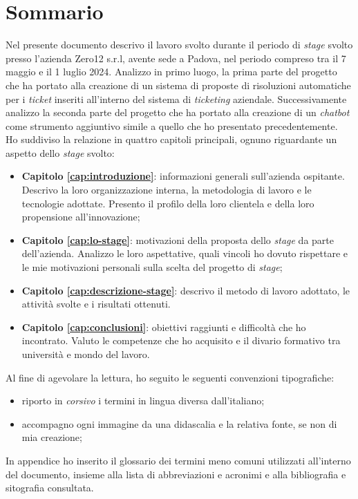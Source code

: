 \cleardoublepage
{}
{}
\begingroup
\let\clearpage\relax
\let\cleardoublepage\relax
\let\cleardoublepage\relax
\chapter*{Sommario}
Nel presente documento descrivo il lavoro svolto durante il periodo di \textit{stage} svolto presso l'azienda Zero12 s.r.l, avente sede a Padova, nel periodo compreso tra il 7 maggio e il 1 luglio 2024.
Analizzo in primo luogo, la prima parte del progetto che ha portato alla creazione di un sistema di proposte di risoluzioni automatiche per i \textit{ticket} inseriti all'interno del sistema di \textit{ticketing} aziendale. Successivamente analizzo la seconda parte del progetto che ha portato alla creazione di un \textit{chatbot} come strumento aggiuntivo simile a quello che ho presentato precedentemente. \\
Ho suddiviso la relazione in quattro capitoli principali, ognuno riguardante un aspetto dello \textit{stage} svolto: 
\begin{itemize}
    \item \textbf{Capitolo \ref{cap:introduzione}}: informazioni generali sull'azienda ospitante. Descrivo la loro organizzazione interna, la metodologia di lavoro e le tecnologie adottate. Presento il profilo della loro clientela e della loro propensione all'innovazione;
    \item \textbf{Capitolo \ref{cap:lo-stage}}: motivazioni della proposta dello \textit{stage} da parte dell'azienda. Analizzo le loro aspettative, quali vincoli ho dovuto rispettare e le mie motivazioni personali sulla scelta del progetto di \textit{stage};
    \item \textbf{Capitolo \ref{cap:descrizione-stage}}: descrivo il metodo di lavoro adottato, le attività svolte e i risultati ottenuti. 
    \item \textbf{Capitolo \ref{cap:conclusioni}}: obiettivi raggiunti e difficoltà che ho incontrato. Valuto le competenze che ho acquisito e il divario formativo tra università e mondo del lavoro.
\end{itemize}
\noindent
Al fine di agevolare la lettura, ho seguito le seguenti convenzioni tipografiche:
\begin{itemize}
    \item riporto in \textit{corsivo} i termini in lingua diversa dall'italiano;
    \item accompagno ogni immagine da una didascalia e la relativa fonte, se non di mia creazione;
\end{itemize}
\noindent
In appendice ho inserito il glossario dei termini meno comuni utilizzati all'interno del documento, insieme alla lista di abbreviazioni e acronimi e alla bibliografia e sitografia consultata.


\endgroup

\vfill
